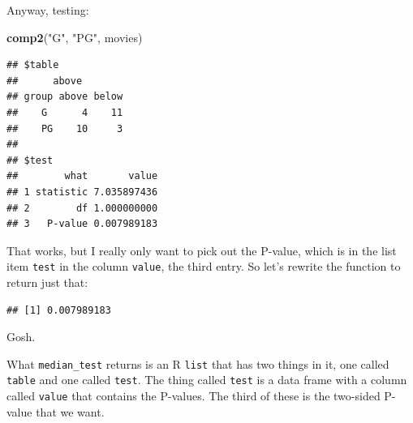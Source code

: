 \documentclass[]{tufte-book}
\newenvironment{Shaded}{}{}
\newcommand{\ControlFlowTok}[1]{\textcolor[rgb]{0.00,0.44,0.13}{\textbf{#1}}}
\newcommand{\DecValTok}[1]{\textcolor[rgb]{0.25,0.63,0.44}{#1}}
\newcommand{\KeywordTok}[1]{\textcolor[rgb]{0.00,0.44,0.13}{\textbf{#1}}}
\newcommand{\NormalTok}[1]{#1}
\newcommand{\OperatorTok}[1]{\textcolor[rgb]{0.40,0.40,0.40}{#1}}
\newcommand{\StringTok}[1]{\textcolor[rgb]{0.25,0.44,0.63}{#1}}
\theoremstyle{definition}
\theoremstyle{definition}
\theoremstyle{definition}
\theoremstyle{remark}
\begin{document}
Anyway, testing:

\begin{Shaded}
\begin{Highlighting}[]
\KeywordTok{comp2}\NormalTok{(}\StringTok{"G"}\NormalTok{, }\StringTok{"PG"}\NormalTok{, movies)}
\end{Highlighting}
\end{Shaded}

\begin{verbatim}
## $table
##      above
## group above below
##    G      4    11
##    PG    10     3
## 
## $test
##        what       value
## 1 statistic 7.035897436
## 2        df 1.000000000
## 3   P-value 0.007989183
\end{verbatim}

That works, but I really only want to pick out the P-value, which is in
the list item \texttt{test} in the column \texttt{value}, the third
entry. So let's rewrite the function to return just that:

\begin{Shaded}
\end{Shaded}

\begin{verbatim}
## [1] 0.007989183
\end{verbatim}

Gosh.

What \texttt{median\_test} returns is an R \texttt{list} that has two
things in it, one called \texttt{table} and one called \texttt{test}.
The thing called \texttt{test} is a data frame with a column called
\texttt{value} that contains the P-values. The third of these is the
two-sided P-value that we want.
\end{document}
